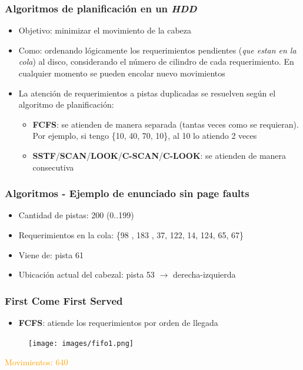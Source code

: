 \begin{frame}
  \frametitle{Algoritmos de planificación en un \textit{HDD}}
  \begin{itemize}
    \item Objetivo: minimizar el movimiento de la cabeza
    \item Como: ordenando lógicamente los requerimientos pendientes (\emph{que estan en la cola}) al disco, considerando el número de cilindro de cada requerimiento. En cualquier momento se pueden encolar nuevo movimientos
    \item La atención de requerimientos a pistas duplicadas se resuelven según el algoritmo de planificación:
    \begin{itemize}
      \item \textbf{FCFS}: se atienden de manera separada (tantas veces como se requieran). Por ejemplo, si tengo \{10, 40, 70, 10\}, al 10 lo atiendo 2 veces
      \item \textbf{SSTF}/\textbf{SCAN}/\textbf{LOOK}/\textbf{C-SCAN}/\textbf{C-LOOK}: se atienden de manera consecutiva
    \end{itemize}
  \end{itemize}
\end{frame}

\begin{frame}
  \frametitle{Algoritmos - Ejemplo de enunciado sin \textbf{page faults}}
  \begin{itemize}
    \item Cantidad de pistas: 200 (0..199)
    \item Requerimientos en la cola: \{98 , 183 , 37, 122, 14, 124, 65, 67\}
    \item Viene de: pista 61
    \item Ubicación actual del cabezal: pista 53 $\rightarrow$ derecha-izquierda
  \end{itemize}
\end{frame}

\begin{frame}
  \frametitle{\textbf{First Come First Served}}
  \begin{itemize}
    \item \textbf{FCFS}: atiende los requerimientos por orden de llegada
  \end{itemize}
  \begin{figure}
    \texttt{[image: images/fifo1.png]}
  \end{figure}
  \hspace{35pt} \textcolor{orange}{Movimientos: 640}
\end{frame}

